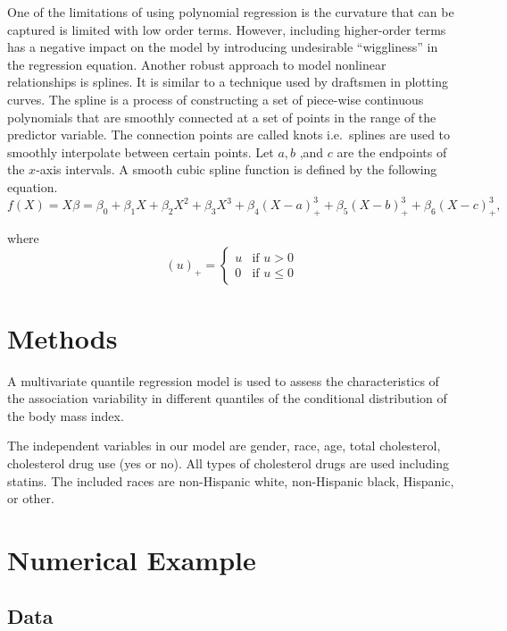 \documentclass[
  12pt,
]{article}
\begin{document}
One of the limitations of using polynomial regression is the curvature that can be captured is limited with low order terms. However, including higher-order terms has a negative impact on the model by introducing undesirable ``wiggliness'' in the regression equation. Another robust approach to model nonlinear relationships is splines. It is similar to a technique used by draftsmen in plotting curves. The spline is a process of constructing a set of piece-wise continuous
polynomials that are smoothly connected at a set of points in the range of the predictor variable. The connection points are called knots i.e.~splines are used to smoothly interpolate between certain points. Let \(a,b\) ,and \(c\) are the endpoints of the \(x\)-axis intervals. A smooth cubic spline function is defined by the following equation.
\begin{equation}
f(X)=X\beta=\beta_{0}+\beta_{1}X+\beta_2X^2+\beta_{3}X^{3}+\beta_{4}(X-a)_{+}^3+\beta_{5}(X-b)_{+}^3+\beta_6(X-c)_{+}^3,
\end{equation}

where \[(u)_{+}=  
 \left\{
\begin{array}{ll}
u  & \mbox{if } u > 0 \\
0 & \mbox{if } u \leq 0
\end{array}
\right. \]

\section{Methods}

A multivariate quantile regression model is used to assess the characteristics of the association variability in different quantiles of the conditional distribution of the body mass index.

The independent variables in our model are gender, race, age, total cholesterol, cholesterol drug use (yes or no). All types of cholesterol drugs are used including statins. The included races are non-Hispanic white, non-Hispanic black, Hispanic, or other.

\section{Numerical Example}
\subsection{Data}
\end{document}
